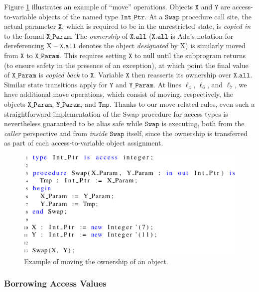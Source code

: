 \documentclass{llncs}
\newcommand\var[1]{\ensuremath{\mathtt{#1}}}
\begin{document}
Figure \ref{fig:move_ex1} illustrates an example of ``move'' operations. Objects \var{X} and \var{Y} are access-to-variable objects of the named type \var{Int\_Ptr}. At a \var{Swap} procedure call site,
the actual parameter \var{X}, which is required to be in the unrestricted state, is \textit{copied in} to the formal \var{X\_Param}. The \textit{ownership} of \var{X.all} (\var{X.all} is Ada's notation for dereferencing X -- \var{X.all} denotes the object \textit{designated} by X) is similarly moved from \var{X} to \var{X\_Param}.
This requires setting \var{X} to null until the subprogram returns (to ensure safety in the presence of an exception), at which point the final value of \var{X\_Param} is \textit{copied back} to \var{X}.
Variable \var{X} then reasserts its ownership over \var{X.all}. Similar state transitions apply for \var{Y} and \var{Y\_Param}.  At lines $\ell_4$, $\ell_6$, and $\ell_7$,
we have additional move operations, which consist of moving, respectively, the objects \var{X\_Param}, \var{Y\_Param}, and \var{Tmp}. Thanks to our move-related rules, even such a straightforward
implementation of the Swap procedure for access types is nevertheless guaranteed to be alias safe while \var{Swap} is executing, both from the \textit{caller} perspective and from \textit{inside} \var{Swap} itself, since the ownership is transferred
as part of each access-to-variable object assignment.

\begin{figure}[htb!]
\centering
   \includegraphics[]{move_ex1}
   \caption{Example of moving the ownership of an object.}
   \label{fig:move_ex1}
\end{figure}

\subsubsection{Borrowing Access Values}
\label{sec:borrowing}
\end{document}
